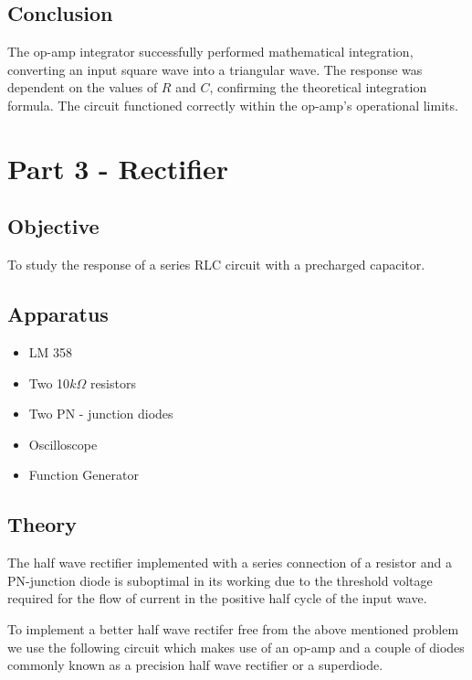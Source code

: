 \documentclass[a4paper,12pt]{article}
\begin{document}
\subsection{Conclusion}
The op-amp integrator successfully performed mathematical integration, converting an input square wave into a triangular wave. The response was dependent on the values of \( R \) and \( C \), confirming the theoretical integration formula. The circuit functioned correctly within the op-amp's operational limits.
\section{Part 3 - Rectifier}
\subsection{Objective}
To study the response of a series RLC circuit with a precharged capacitor.

\subsection{Apparatus}
\begin{itemize}
\item LM 358
\item Two 10$k\Omega$ resistors
\item Two PN - junction diodes
\item Oscilloscope
\item Function Generator
\end{itemize}
\subsection{Theory}

The half wave rectifier implemented with a series connection of a resistor and a PN-junction diode is suboptimal in its working due to the threshold voltage required for the flow of current in the 
positive half cycle of the input wave. 

To implement a better half wave rectifer free from the above mentioned problem we use the following circuit which makes use of an op-amp and a couple of diodes commonly known as a precision half wave
rectifier or a superdiode.
\end{document}

